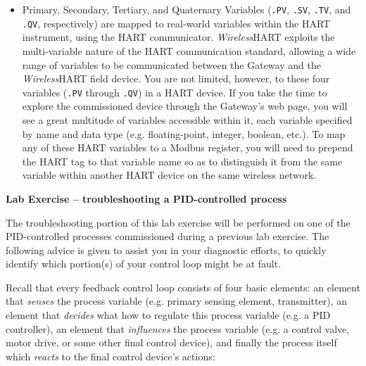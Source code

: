 \begin{itemize}
\itemitem{} {\bf Float} Floating-point numbers maintained in their original 32-bit floating-point form.
\itemitem{} {\bf Round} Floating-point numbers rounded to the nearest 32-bit integer value.
\itemitem{} {\bf Scale} Floating-point numbers scaled as 32-bit integers using the formula $y = Ax - (B - 32768)$.  The values of $A$ (gain) and $B$ (offset) may be set globally on the Modbus Communication page (not recommended), or individually for each variable on the Modbus Mapping page.
\vskip 5pt
\item{} Primary, Secondary, Tertiary, and Quaternary Variables ({\tt .PV}, {\tt .SV}, {\tt .TV}, and {\tt .QV}, respectively) are mapped to real-world variables within the HART instrument, using the HART communicator.  {\sl Wireless}HART exploits the multi-variable nature of the HART communication standard, allowing a wide range of variables to be communicated between the Gateway and the {\sl Wireless}HART field device.  You are not limited, however, to these four variables ({\tt .PV} through {\tt .QV}) in a HART device.  If you take the time to explore the commissioned device through the Gateway's web page, you will see a great multitude of variables accessible within it, each variable specified by name and data type (e.g. floating-point, integer, boolean, etc.).  To map any of these HART variables to a Modbus register, you will need to prepend the HART tag to that variable name so as to distinguish it from the same variable within another HART device on the same wireless network.
\end{itemize}










\vfil \eject

\noindent
{\bf Lab Exercise -- troubleshooting a PID-controlled process}

\vskip 10pt

The troubleshooting portion of this lab exercise will be performed on one of the PID-controlled processes commissioned during a previous lab exercise.  The following advice is given to assist you in your diagnostic efforts, to quickly identify which portion(s) of your control loop might be at fault.

\vskip 10pt

Recall that every feedback control loop consists of four basic elements: an element that {\it senses} the process variable (e.g. primary sensing element, transmitter), an element that {\it decides} what how to regulate this process variable (e.g. a PID controller), an element that {\it influences} the process variable (e.g. a control valve, motor drive, or some other final control device), and finally the process itself which {\it reacts} to the final control device's actions:

